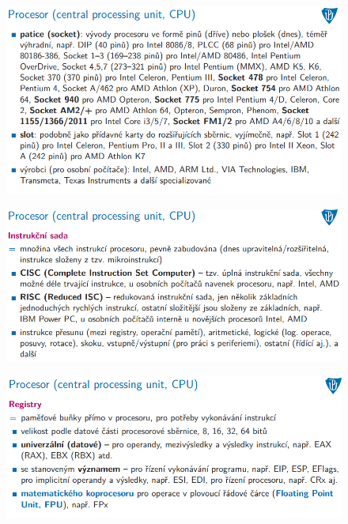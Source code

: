 \documentclass[10pt,a4paper]{article}
\begin{document}
\begin{figure} [h]
	\includegraphics[scale=0.65]{img/prvni_odstavec/otazka5/procesor3.png}	
\end{figure}

\begin{figure} [h]
	\includegraphics[scale=0.65]{img/prvni_odstavec/otazka5/procesor4.png}	
\end{figure}

\begin{figure} [h]
	\includegraphics[scale=0.65]{img/prvni_odstavec/otazka5/procesor5.png}	
\end{figure}
\end{document}
